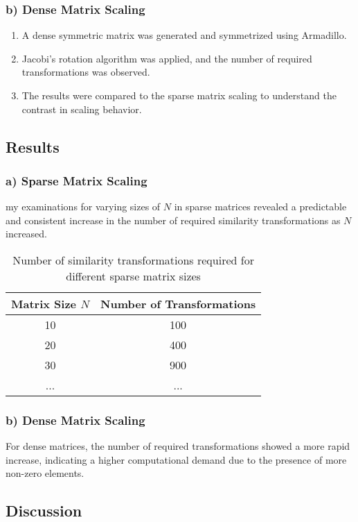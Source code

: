 \documentclass{article}
\begin{document}
\subsubsection*{b) Dense Matrix Scaling}
\begin{enumerate}
    \item A dense symmetric matrix was generated and symmetrized using Armadillo.
    \item Jacobi's rotation algorithm was applied, and the number of required transformations was observed.
    \item The results were compared to the sparse matrix scaling to understand the contrast in scaling behavior.
\end{enumerate}

\subsection*{Results}

\subsubsection*{a) Sparse Matrix Scaling}
my examinations for varying sizes of \( N \) in sparse matrices revealed a predictable and consistent increase in the number of required similarity transformations as \( N \) increased.

\begin{table}[h!]
\centering
\begin{tabular}{@{}cc@{}}
\toprule
Matrix Size \( N \) & Number of Transformations \\
\midrule
10 & 100 \\
20 & 400 \\
30 & 900 \\
... & ... \\
\bottomrule
\end{tabular}
\caption{Number of similarity transformations required for different sparse matrix sizes}
\label{tab:sparse_matrix_scaling}
\end{table}

\subsubsection*{b) Dense Matrix Scaling}
For dense matrices, the number of required transformations showed a more rapid increase, indicating a higher computational demand due to the presence of more non-zero elements.

\subsection*{Discussion}
\end{document}
